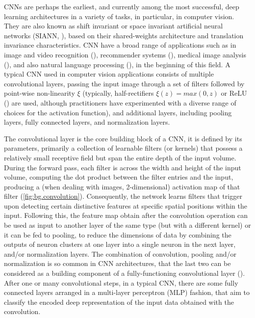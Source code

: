 \documentclass[binding=0.6cm]{sapthesis}
\newcommand{\mycite}[1]{(\cite{#1})}
\begin{document}
CNNs are perhaps the earliest, and currently among the most successful, deep learning architectures in a variety of tasks, in particular, in computer vision. They are also known as shift invariant or space invariant artificial neural networks (SIANN, \cite{chaman2021-siann}), based on their shared-weights architecture and translation invariance characteristics. CNN have a broad range of applications such as in image and video recognition \mycite{valueva2020-cnn-application}, recommender systems \mycite{dieleman2013-cnn-recommendation}, medical image analysis \mycite{yu2021-cnn-medical}, and also natural language processing \mycite{collobert2008-cnn-nlp}, in the beginning of this field. A typical CNN used in computer vision applications consists of multiple convolutional layers, passing the input image through a set of filters followed by point-wise non-linearity $\xi$ (typically, half-rectifiers $\xi(z) = max(0, z)$ or ReLU \mycite{nairHinton2010-relu} are used, although practitioners have experimented with a diverse range of choices for the activation function), and additional layers, including pooling layers, fully connected layers, and normalization layers.

The convolutional layer is the core building block of a CNN, it is defined by its parameters, primarily a collection of learnable filters (or kernels) that possess a relatively small receptive field but span the entire depth of the input volume. During the forward pass, each filter is  across the width and height of the input volume, computing the dot product between the filter entries and the input, producing a (when dealing with images, 2-dimensional) activation map of that filter (\cref{fig:bg.convolution}). Consequently, the network learns filters that trigger upon detecting certain distinctive features at specific spatial positions within the input. Following this, the feature map obtain after the convolution operation can be used as input to another layer of the same type (but with a different kernel) or it can be fed to pooling, to reduce the dimensions of data by combining the outputs of neuron clusters at one layer into a single neuron in the next layer, and/or normalization layers. The combination of convolution, pooling and/or normalization is so common in CNN architectures, that the last two can be considered as a building component of a fully-functioning convolutional layer \mycite{LeCun2015DeepL}. After one or many convolutional steps, in a typical CNN, there are some fully connected layers arranged in a multi-layer perceptron (MLP) fashion, that aim to classify the encoded deep representation of the input data obtained with the convolution.
\end{document}
